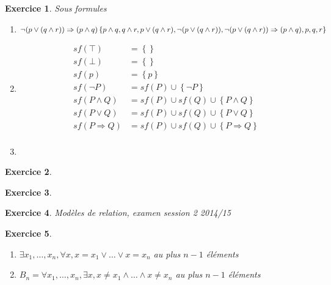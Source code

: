 \documentclass{article}
\theoremstyle{plain}
\newtheorem{exo}{Exercice}%
\begin{document}
\begin{exo}Sous formules
\begin{enumerate}
    \item $\neg(p \vee (q \wedge r)) \Rightarrow (p \wedge q) \\
         \left\{p \wedge q, q \wedge r,
            p \vee (q \wedge r),
            \neg(p \vee(q \wedge r)),\neg(p \vee(q \wedge r)) \Rightarrow (p \wedge q)
            , p, q, r\right\}$
    \item \begin{align*}
        sf(\top) &= \left\{\right\} \\
        sf(\bot) &= \left\{\right\} \\
        sf(p) &= \left\{p\right\} \\
        sf(\neg P) &= sf(P) \cup \left\{\neg P\right\}  \\
        sf(P \wedge Q) &= sf(P) \cup sf(Q) \cup \left\{P \wedge Q\right\}\\
        sf(P \vee Q) &= sf(P) \cup sf(Q) \cup \left\{P \vee Q\right\}\\
        sf(P \Rightarrow Q) &= sf(P) \cup sf(Q) \cup \left\{P \Rightarrow Q\right\}\\
    \end{align*}

    \item 
\end{enumerate}
\end{exo}

\begin{exo}

\end{exo}

\begin{exo}

\end{exo}

\begin{exo}Modèles de relation, examen session 2 2014/15

\end{exo}

\begin{exo}
\begin{enumerate}
\item $\exists x_1, \ldots , x_n, \forall x,  
        x = x_1 \vee \ldots \vee x = x_{n}$ 
    au plus $n - 1$ éléments

\item $B_n = \forall x_1, \ldots , x_n, \exists x,  
x \neq  x_1 \wedge \ldots \wedge x \neq  x_{n}$ 
au plus $n - 1$ éléments
\end{enumerate}
\end{exo}
\end{document}
